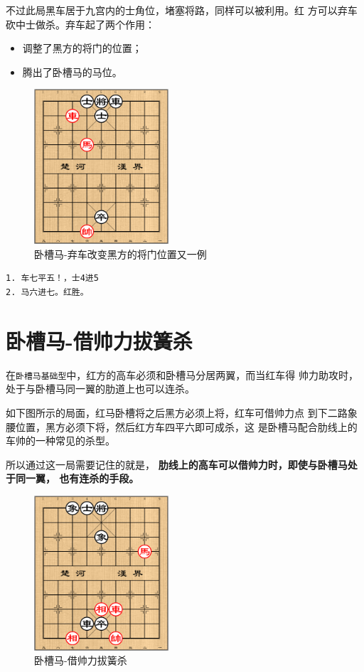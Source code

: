 \documentclass[a5paper,twoside]{book}
\begin{document}
不过此局黑车居于九宫内的士角位，堵塞将路，同样可以被利用。红
方可以弃车砍中士做杀。弃车起了两个作用：
\begin{itemize}
\item 调整了黑方的将门的位置；
\item 腾出了卧槽马的马位。
\end{itemize}


\begin{figure}[H]
\centering
\includegraphics[width=5cm]{pic/卧槽马-弃车改变黑方的将门位置又一例.png}
\caption{卧槽马-弃车改变黑方的将门位置又一例}
\end{figure}

\begin{verbatim}
1. 车七平五！，士4进5
2. 马六进七。红胜。
\end{verbatim}

\section{卧槽马-借帅力拔簧杀}
\label{sec-2-5}

在\texttt{卧槽马基础型}中，红方的高车必须和卧槽马分居两翼，而当红车得
帅力助攻时，处于与卧槽马同一翼的肋道上也可以连杀。

如下图所示的局面，红马卧槽将之后黑方必须上将，红车可借帅力点
到下二路象腰位置，黑方必须下将，然后红方车四平六即可成杀，这
是卧槽马配合肋线上的车帅的一种常见的杀型。

所以通过这一局需要记住的就是， \textbf{肋线上的高车可以借帅力时，即使与卧槽马处于同一翼，
也有连杀的手段。}

\begin{figure}[H]
\centering
\includegraphics[width=5cm]{pic/卧槽马-借帅力拔簧杀.png}
\caption{卧槽马-借帅力拔簧杀}
\end{figure}
\end{document}
